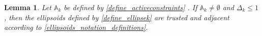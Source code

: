 \documentclass{article}
\newtheorem{lemma}[theorem]{Lemma}
\theoremstyle{case}
\numberwithin{theorem}{subsection}
\newcommand{\activeconstraintsk}{{\mathbb A_{k}}}
\newcommand{\bs}{{\beta^{(\star, k)}}}
\newcommand{\bsk}{{\beta_0^{(\star, k)}}}
\newcommand{\dacc}{{\Delta_{\textrm{acc}}}}
\newcommand{\dk}{\Delta_k}
\newcommand{\omegainc}{\omega_{\text{inc}}}
\newcommand{\rotk}{{R^{(k+1)}}}
\begin{document}
\begin{lemma}
\label{ellsoid_is_suitable_theorem_p2}
Let $\activeconstraintsk$ 
be defined by 
\cref{define_activeconstraints}
.
If $\activeconstraintsk \ne \emptyset$ and $\dk \le 1$, 
then the ellipsoids defined by \cref{define_ellipsek} are trusted and adjacent according to \cref{ellipsoids_notation_definitions}.

\end{lemma}
\end{document}
